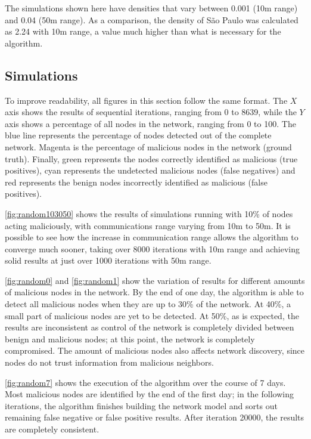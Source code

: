\documentclass[conference]{IEEEtran}
\begin{document}
The simulations shown here have densities that vary between 0.001 (10m range) and 0.04 (50m range).
As a comparison, the density of São Paulo was calculated as 2.24 with 10m range, a value much higher than what is necessary for the algorithm.

\subsection{Simulations}
\label{subsection:simulations}
To improve readability, all figures in this section follow the same format.
The $X$ axis shows the results of sequential iterations, ranging from 0 to 8639, while the $Y$ axis shows a percentage of all nodes in the network, ranging from 0 to 100.
The blue line represents the percentage of nodes detected out of the complete network.
Magenta is the percentage of malicious nodes in the network (ground truth).
Finally, green represents the nodes correctly identified as malicious (true positives), cyan represents the undetected malicious nodes (false negatives) and red represents the benign nodes incorrectly identified as malicious (false positives).


\autoref{fig:random103050} shows the results of simulations running with 10\% of nodes acting maliciously, with communications range varying from 10m to 50m.
It is possible to see how the increase in communication range allows the algorithm to converge much sooner, taking over 8000 iterations with 10m range and achieving solid results at just over 1000 iterations with 50m range. 

\autoref{fig:random0} and \autoref{fig:random1} show the variation of results for different amounts of malicious nodes in the network.
By the end of one day, the algorithm is able to detect all malicious nodes when they are up to 30\% of the network.
At 40\%, a small part of malicious nodes are yet to be detected.
At 50\%, as is expected, the results are inconsistent as control of the network is completely divided between benign and malicious nodes; at this point, the network is completely compromised.
The amount of malicious nodes also affects network discovery, since nodes do not trust information from malicious neighbors.

\autoref{fig:random7} shows the execution of the algorithm over the course of 7 days.
Most malicious nodes are identified by the end of the first day; in the following iterations, the algorithm finishes building the network model and sorts out remaining false negative or false positive results.
After iteration 20000, the results are completely consistent.
\end{document}
